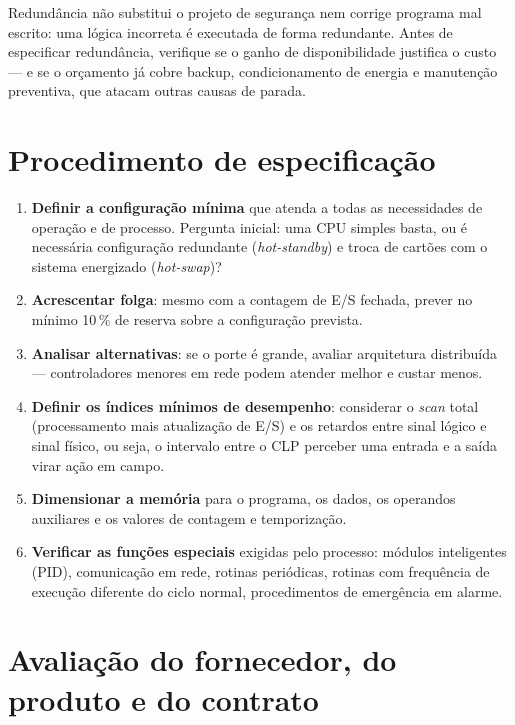 \begin{atencao}
Redundância não substitui o projeto de segurança nem corrige programa mal escrito: uma lógica
incorreta é executada de forma redundante. Antes de especificar redundância, verifique se o ganho de
disponibilidade justifica o custo --- e se o orçamento já cobre backup, condicionamento de energia e
manutenção preventiva, que atacam outras causas de parada.
\end{atencao}

\section{Procedimento de especificação}

\begin{enumerate}
  \item \textbf{Definir a configuração mínima} que atenda a todas as necessidades de operação e de
        processo. Pergunta inicial: uma CPU simples basta, ou é necessária configuração redundante
        (\emph{hot-standby}) e troca de cartões com o sistema energizado (\emph{hot-swap})?
  \item \textbf{Acrescentar folga}: mesmo com a contagem de E/S fechada, prever no mínimo 10\,\% de
        reserva sobre a configuração prevista.
  \item \textbf{Analisar alternativas}: se o porte é grande, avaliar arquitetura distribuída ---
        controladores menores em rede podem atender melhor e custar menos.
  \item \textbf{Definir os índices mínimos de desempenho}: considerar o \emph{scan} total
        (processamento mais atualização de E/S) e os retardos entre sinal lógico e sinal físico, ou
        seja, o intervalo entre o CLP perceber uma entrada e a saída virar ação em campo.
  \item \textbf{Dimensionar a memória} para o programa, os dados, os operandos auxiliares e os
        valores de contagem e temporização.
  \item \textbf{Verificar as funções especiais} exigidas pelo processo: módulos inteligentes (PID),
        comunicação em rede, rotinas periódicas, rotinas com frequência de execução diferente do
        ciclo normal, procedimentos de emergência em alarme.
\end{enumerate}

\section{Avaliação do fornecedor, do produto e do contrato}


